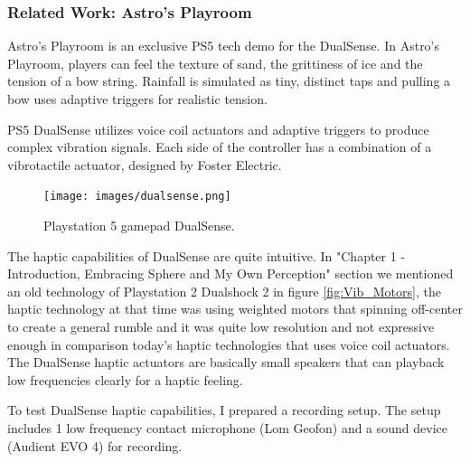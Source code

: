             \subsubsection{Related Work: Astro's Playroom}
                Astro's Playroom is an exclusive PS5 tech demo for the DualSense. In Astro's Playroom, players can feel the texture of sand, the grittiness of ice and the tension of a bow string. Rainfall is simulated as tiny, distinct taps and pulling a bow uses adaptive triggers for realistic tension.\par

                PS5 DualSense utilizes voice coil actuators and adaptive triggers to produce complex vibration signals\cite{What_is_under_Dualsense}. Each side of the controller has a combination of a vibrotactile actuator, designed by Foster Electric.\par
                
                \begin{figure}[H]
                    \centering
                    \texttt{[image: images/dualsense.png]}
                    \caption{Playstation 5 gamepad DualSense.}
                    \label{fig:DUALSENSE}
                \end{figure}

                The haptic capabilities of DualSense are quite intuitive. In "Chapter 1 - Introduction, Embracing Sphere and My Own Perception" section we mentioned an old technology of Playstation 2 Dualshock 2 in figure \ref{fig:Vib_Motors}, the haptic technology at that time was using weighted motors that spinning off-center to create a general rumble and it was quite low resolution and not expressive enough in comparison today's haptic technologies that uses voice coil actuators\cite{Audio-Tactile_Rendering}. The DualSense haptic actuators are basically small speakers that can playback low frequencies clearly for a haptic feeling.\par

                To test DualSense haptic capabilities, I prepared a recording setup. The setup includes 1 low frequency contact microphone (Lom Geofon) and a sound device (Audient EVO 4) for recording.\par

